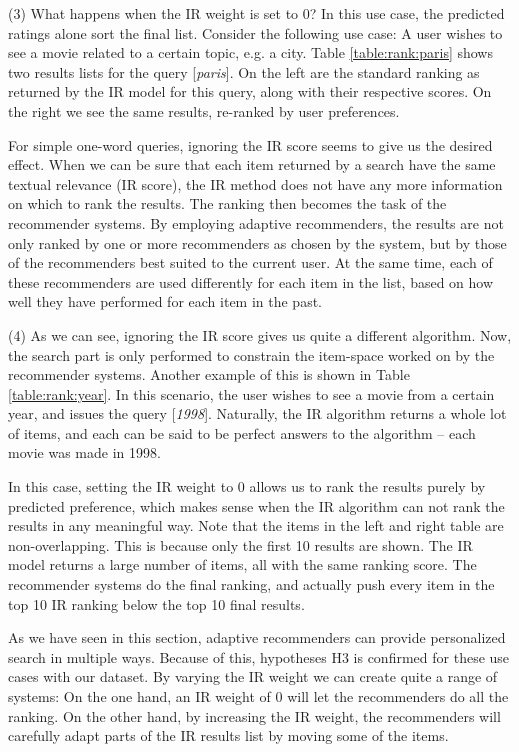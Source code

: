 (3) What happens when the IR weight is set to $0$?
In this use case, the predicted ratings alone sort the final list.
Consider the following use case:
A user wishes to see a movie related to a certain topic, e.g. a city.
Table \ref{table:rank:paris} shows two results lists for the query [\emph{paris}].
On the left are the standard ranking as returned by the IR model for this query,
along with their respective scores.
On the right we see the same results, re-ranked by user preferences.

For simple one-word queries, ignoring the IR score seems to give us the desired effect.
When we can be sure that each item returned by a search have the same textual relevance
(IR score), the IR method does not have any more information on which to rank
the results. The ranking then becomes the task of the recommender systems.
By employing adaptive recommenders, the results are not only ranked by 
one or more recommenders as chosen by the system, but by those of the recommenders
best suited to the current user. At the same time, each of these recommenders
are used differently for each item in the list, based on how well they have
performed for each item in the past.

(4) As we can see, ignoring the IR score gives us quite a different algorithm.
Now, the search part is only performed to constrain the item-space worked
on by the recommender systems.
Another example of this is shown in Table \ref{table:rank:year}.
In this scenario, the user wishes to see a movie from a certain year,
and issues the query [\emph{1998}].
Naturally, the IR algorithm returns a whole lot of items, and each can
be said to be perfect answers to the algorithm -- each movie
was made in 1998.

In this case, setting the IR weight to $0$ allows us to rank the results
purely by predicted preference, which makes sense when the IR algorithm
can not rank the results in any meaningful way.
Note that the items in the left and right table are non-overlapping.
This is because only the first 10 results are shown.
The IR model returns a large number of items,
all with the same ranking score.
The recommender systems do the final ranking, and actually
push every item in the top 10 IR ranking 
below the top 10 final results.



As we have seen in this section, adaptive recommenders can provide personalized search
in multiple ways. 
Because of this, hypotheses H3 is confirmed for these use cases with our dataset.
By varying the IR weight we can create quite a range of systems:
On the one hand, an IR weight of 0 will let the recommenders do all the ranking.
On the other hand, by increasing the IR weight, the recommenders will carefully
adapt parts of the IR results list by moving some of the items.

